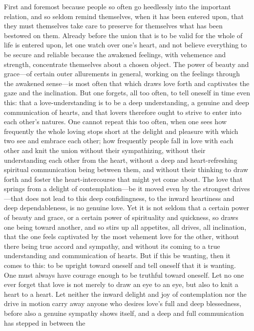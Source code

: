 \documentclass[12pt,a4paper]{book}
\begin{document}
First and foremost because people so often go heedlessly into the important
relation, and so seldom remind themselves, when it has been entered upon,
that they must themselves take care to preserve for themselves what has
been bestowed on them. Already before the union that is to be valid for the
whole of life is entered upon, let one watch over one's heart, and not
believe everything to be secure and reliable because the awakened feelings,
with vehemence and strength, concentrate themselves about a chosen object.
The power of beauty and grace---of certain outer allurements in general,
working on the feelings through the awakened sense---is most often that
which draws love forth and captivates the gaze and the inclination. But one
forgets, all too often, to tell oneself in time even this: that a
love-understanding is to be a deep understanding, a genuine and deep
communication of hearts, and that lovers therefore ought to strive to enter
into each other's natures. One cannot repeat this too often, when one sees
how frequently the whole loving stops short at the delight and pleasure
with which two see and embrace each other; how frequently people fall in
love with each other and knit the union without their sympathizing, without
their understanding each other from the heart, without a deep and
heart-refreshing spiritual communication being between them, and without
their thinking to draw forth and foster the heart-intercourse that might
yet come about. The love that springs from a delight of contemplation---be
it moved even by the strongest drives---that does not lead to this deep
confidingness, to the inward heartiness and deep dependableness, is no
genuine love. Yet it is not seldom that a certain power of beauty and
grace, or a certain power of spirituality and quickness, so draws one being
toward another, and so stirs up all appetites, all drives, all inclination,
that the one feels captivated by the most vehement love for the other,
without there being true accord and sympathy, and without its coming to a
true understanding and communication of hearts. But if this be wanting,
then it comes to this: to be upright toward oneself and tell oneself that
it is wanting. One must always have courage enough to be truthful toward
oneself. Let no one ever forget that love is not merely to draw an eye to
an eye, but also to knit a heart to a heart. Let neither the inward delight
and joy of contemplation nor the drive in motion carry away anyone who
desires love's full and deep blessedness, before also a genuine sympathy
shows itself, and a deep and full communication has stepped in between the
\end{document}
